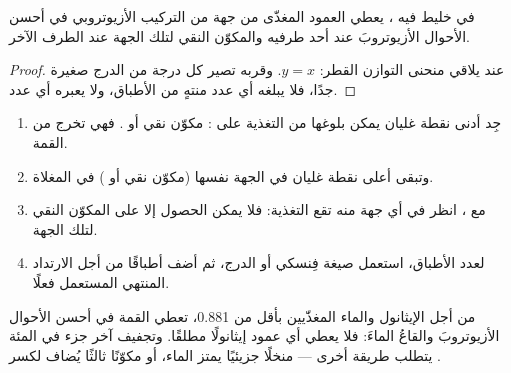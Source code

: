 \begin{proposition}\label{prop:b2:liquid-vapour-diagrams:azeotrope-limit}
في خليط فيه ، يعطي العمود المغذّى من جهة من التركيب
الأزيوتروبي في أحسن الأحوال الأزيوتروبَ عند أحد طرفيه والمكوّن النقي
لتلك الجهة عند الطرف الآخر.
\end{proposition}

\begin{proof}
عند  يلاقي منحنى التوازن القطر: $y = x$. وقربه
تصير كل درجة من الدرج صغيرة جدًا، فلا يبلغه أي عدد منتهٍ من
الأطباق، ولا يعبره أي عدد.
\end{proof}

\begin{method}\label{met:b2:liquid-vapour-diagrams:predict-distillation}
\begin{enumerate}
  \item جِد أدنى نقطة غليان يمكن بلوغها من التغذية على
        : مكوّن نقي أو . فهي تخرج
        من القمة.
  \item وتبقى أعلى نقطة غليان في الجهة نفسها (مكوّن نقي أو
        ) في المغلاة.
  \item مع ، انظر في أي جهة منه تقع التغذية: فلا يمكن الحصول إلا على
        المكوّن النقي لتلك الجهة.
  \item لعدد الأطباق، استعمل صيغة فِنسكي أو الدرج،
        ثم أضف أطباقًا من أجل الارتداد المنتهي المستعمل فعلًا.
\end{enumerate}
\end{method}

من أجل الإيثانول والماء المغذّيين بأقل من 0.881، تعطي القمة في أحسن الأحوال
الأزيوتروبَ والقاعُ الماءَ: فلا يعطي أي عمود إيثانولًا مطلقًا. وتجفيف
آخر جزء في المئة يتطلب طريقة أخرى --- منخلًا جزيئيًا يمتز الماء، أو
مكوّنًا ثالثًا يُضاف لكسر .

